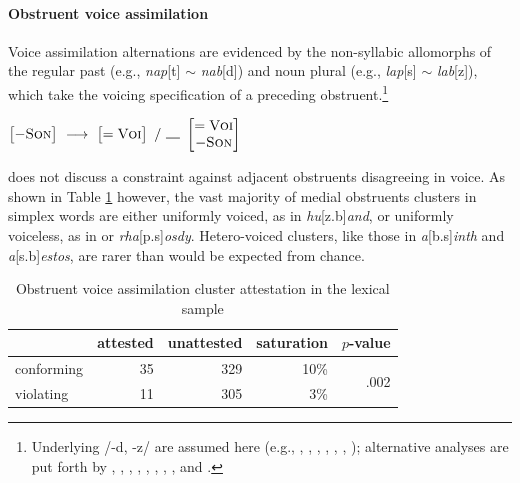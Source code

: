 \paragraph{Obstruent voice assimilation}
\label{ova}

Voice assimilation alternations are evidenced by the non-syllabic allomorphs of the regular past (e.g., \emph{nap}[t] $\sim$ \emph{nab}[d]) and noun plural (e.g., \emph{lap}[s] $\sim$ \emph{lab}[z]), which take the voicing specification of a preceding obstruent.\footnote{Underlying /-d, -z/ are assumed here (e.g., \citealt{Anderson1973a}, \citealt[284f.]{Bakovic2005b}, \citealt{Basboll1972}, \citealt[210]{SPE}, \citealt[282]{Hockett1958}, \citealt[102]{Pinker1988}, \citealt{Shibatani1972}); alternative analyses are put forth by \citet[210f.]{LANGUAGE}, \citet[135]{Borowsky1986}, \citet{Hoard1971}, \citet{Kiparsky1985}, \citet{Lightner1970}, \citet{Luelsdorff1969}, \citet{Miner1975}, \citet[426]{Nida1948}, and \citet{Zwicky1975}.}

\begin{example}
\label{ovarule}
$\begin{bmatrix} -\textsc{Son} \end{bmatrix}~\goesto~\begin{bmatrix} =\textsc{Voi} \end{bmatrix}~/~\gap~\begin{bmatrix} =\textsc{Voi} \\ -\textsc{Son} \end{bmatrix}$
\end{example}

\noindent
\citet{Pierrehumbert1994} does not discuss a constraint against adjacent obstruents disagreeing in voice. 
As shown in Table \ref{ovatab} however, the vast majority of medial obstruents clusters in simplex words are either uniformly voiced, as in \emph{hu}[z.b]\emph{and}, or uniformly voiceless, as in or \emph{rha}[p.s]\emph{osdy}. Hetero-voiced clusters, like those in \emph{a}[b.s]\emph{inth} and \emph{a}[s.b]\emph{estos}, are rarer than would be expected from chance.

\begin{table}[ht]
\centering
\begin{tabular}{l rrrr}
\toprule
           & attested & unattested & saturation & $p$-value \\
\midrule
conforming & 35       & 329        & 10\%       & \multirow{2}{*}{.002} \\
violating  & 11       & 305        &  3\%       \\
\bottomrule
\end{tabular}
\caption{Obstruent voice assimilation cluster attestation in the lexical sample}
\label{ovatab}
\end{table}


